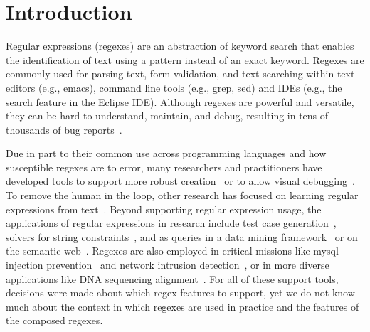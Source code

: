 \section{Introduction }

Regular expressions (regexes) are an abstraction of keyword search that enables the identification of text using a pattern instead of an exact keyword.
Regexes are commonly used for parsing text, form validation, and text searching within text editors (e.g., emacs), command line tools (e.g., grep, sed) and IDEs (e.g., the search feature in the Eclipse IDE).  Although regexes are powerful and versatile, they can be hard to understand,  maintain, and debug, resulting in tens of thousands of bug reports~\cite{Spishak:2012:TSR:2318202.2318207}.

Due in part to their common use across programming languages and how susceptible regexes are to error, many researchers and practitioners have developed tools to support more robust creation~\cite{Spishak:2012:TSR:2318202.2318207} or to allow visual debugging~\cite{Beck:2014:RVD:2591062.2591111}. To remove the human in the loop, other research has focused on learning regular expressions from  text~\cite{Babbar:2010:CBA:1871840.1871848, Li:2008:REL:1613715.1613719}.
Beyond supporting regular expression usage, the applications of regular expressions in research include test case generation~\cite{Ghosh:2013:JAT:2486788.2486925, Galler:2014:STD:2683035.2683100, Anand:2013:OSM:2503903.2503991, Tillmann:2014:TAT:2642937.2642941},
solvers for string constraints~\cite{Trinh:2014:SSS:2660267.2660372, hampi}, and as queries in a data mining framework~\cite{Begel:2010:CDE:1806799.1806821} or on the semantic web~\cite{Lee:2010:PSQ:1871871.1871877}.
Regexes are also employed in critical missions like mysql injection prevention~\cite{Yeole:2011:ADT:1980022.1980229} and network intrusion detection~\cite{network}, or in more diverse applications like DNA sequencing alignment~\cite{1594922}.
For all of these support tools, decisions were made about which regex features to support, yet we do not know much about the context in which regexes are used in practice and the features of the composed regexes. 



